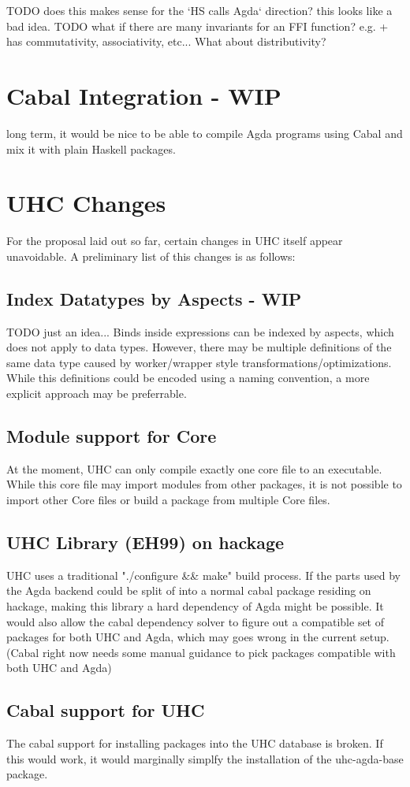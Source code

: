 \documentclass[12pt, a4paper, twoside]{report}
\begin{document}
TODO does this makes sense for the `HS calls Agda` direction? this looks like a bad idea.
TODO what if there are many invariants for an FFI function? e.g. + has
commutativity, associativity, etc... What about distributivity?
\section{Cabal Integration - WIP}
long term, it would be nice to be able to compile Agda programs using Cabal and
mix it with plain Haskell packages.

\section{UHC Changes}
For the proposal laid out so far, certain changes in UHC itself appear
unavoidable. A preliminary list of this changes is as follows:

\subsection{Index Datatypes by Aspects - WIP}
TODO just an idea...
Binds inside expressions can be indexed by aspects, which does
not apply to data types. However, there may be multiple definitions
of the same data type caused by worker/wrapper style transformations/optimizations.
While this definitions could be encoded using a naming convention, a more explicit
approach may be preferrable.

\subsection{Module support for Core}
At the moment, UHC can only compile exactly one core file to an executable.
While this core file may import modules from other packages, it is not possible
to import other Core files or build a package from multiple Core files.

\subsection{UHC Library (EH99) on hackage}
UHC uses a traditional "./configure \&\& make" build process. If the parts used by the
Agda backend could be split of into a normal cabal package residing on hackage,
making this library a hard dependency of Agda might be possible.
It would also allow the cabal dependency solver to figure out a compatible
set of packages for both UHC and Agda, which may goes wrong in the current setup.
(Cabal right now needs some manual guidance to pick packages compatible with both UHC and Agda)

\subsection{Cabal support for UHC}
The cabal support for installing packages into the UHC database is broken. If this would work, it
would marginally simplfy the installation of the uhc-agda-base package.


{}

\end{document}
